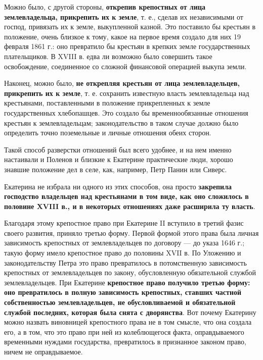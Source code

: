 \documentclass{article}
\begin{document}
\hfill

Можно было, с другой стороны, \textbf{открепив крепостных от лица землевладельца, прикрепить их к земле}, т. е., сделав их независимыми от господ, привязать их к земле, выкупленной казной. Это поставило бы крестьян в положение, очень близкое к тому, какое на первое время создало для них 19 февраля 1861 г.: оно превратило бы крестьян в крепких земле государственных плательщиков. В XVIII в. едва ли возможно было совершить такое освобождение, соединенное со сложной финансовой операцией выкупа земли.

\hfill

Наконец, можно было, \textbf{не открепляя крестьян от лица землевладельцев, прикрепить их к земле}, т. е. сохранить известную власть землевладельца над крестьянами, поставленными в положение прикрепленных к земле государственных хлебопашцев. Это создало бы временнообязанные отношения крестьян к землевладельцам; законодательство в таком случае должно было определить точно поземельные и личные отношения обеих сторон.

Такой способ разверстки отношений был всего удобнее, и на нем именно настаивали и Поленов и близкие к Екатерине практические люди, хорошо знавшие положение дел в селе, как, например, Петр Панин или Сиверс.

\hfill

Екатерина не избрала ни одного из этих способов, она просто \textbf{закрепила господство владельцев над крестьянами в том виде, как оно сложилось в половине XVIII в., и в некоторых отношениях даже расширила ту власть}.

Благодаря этому крепостное право при Екатерине II вступило в третий фазис своего развития, приняло третью форму. Первой формой этого права была личная зависимость крепостных от землевладельцев по договору — до указа 1646 г.; такую форму имело крепостное право до половины XVII в. По Уложению и законодательству Петра это право превратилось в потомственную зависимость крепостных от землевладельцев по закону, обусловленную обязательной службой землевладельцев. При Екатерине \textbf{крепостное право получило третью форму: оно превратилось в полную зависимость крепостных, ставших частной собственностью землевладельцев, не обусловливаемой и обязательной службой последних, которая была снята с дворянства}. Вот почему Екатерину можно назвать виновницей крепостного права не в том смысле, что она создала его, а в том, что это право при ней из колеблющегося факта, оправдываемого временными нуждами государства, превратилось в признанное законом право, ничем не оправдываемое.
\end{document}
